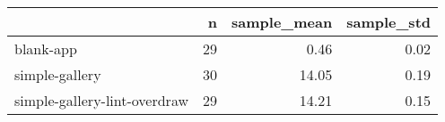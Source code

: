 \begin{tabular}{lrrr}
\toprule
{} &   n &  sample\_mean &  sample\_std \\
\midrule
blank-app                    &  29 &         0.46 &        0.02 \\
simple-gallery               &  30 &        14.05 &        0.19 \\
simple-gallery-lint-overdraw &  29 &        14.21 &        0.15 \\
\bottomrule
\end{tabular}
